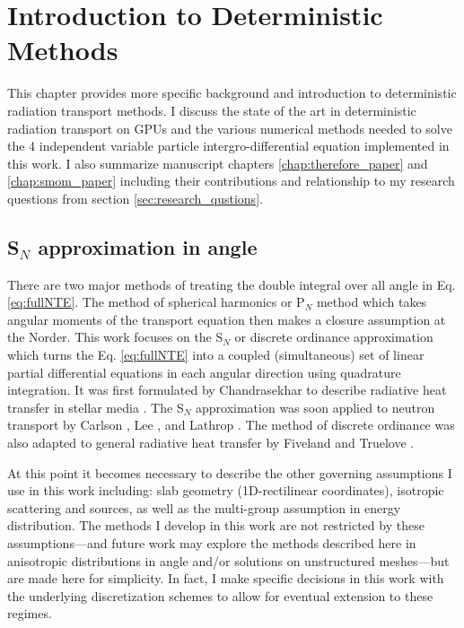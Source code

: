 \chapter{Introduction to Deterministic Methods}
\label{chap:determ_intro}


This chapter provides more specific background and introduction to deterministic radiation transport methods.
I discuss the state of the art in deterministic radiation transport on GPUs and the various numerical methods needed to solve the 4 independent variable particle intergro-differential equation implemented in this work.
I also summarize manuscript chapters \ref{chap:therefore_paper} and \ref{chap:smom_paper} including their contributions and relationship to my research questions from section \ref{sec:research_qustions}.

\section{S$_N$ approximation in angle}

There are two major methods of treating the double integral over all angle in Eq. \ref{eq:fullNTE}.
The method of spherical harmonics or P$_{N}$ method which takes angular moments of the transport equation then makes a closure assumption at the N\ths  order.
This work focuses on the S$_N$ or discrete ordinance approximation which turns the Eq. \ref{eq:fullNTE} into a coupled (simultaneous) set of linear partial differential equations in each angular direction using quadrature integration.
It was first formulated by Chandrasekhar to describe radiative heat transfer in stellar media \cite{chandrasekhar1960radiative}.
The S$_N$ approximation was soon applied to neutron transport by Carlson \cite{precise1971carlson}, Lee \cite{discrete1961lee}, and Lathrop \cite{discrete1966lathnrop}.
The method of discrete ordinance was also adapted to general radiative heat transfer by Fiveland \cite{three1988fiveland} and Truelove \cite{discrete1987truelove}.

At this point it becomes necessary to describe the other governing assumptions I use in this work including:
slab geometry (1D-rectilinear coordinates), isotropic scattering and sources, as well as the multi-group assumption in energy distribution.
The methods I develop in this work are not restricted by these assumptions---and future work may explore the methods described here in anisotropic distributions in angle and/or solutions on unstructured meshes---but are made here for simplicity.
In fact, I make specific decisions in this work with the underlying discretization schemes to allow for eventual extension to these regimes.

